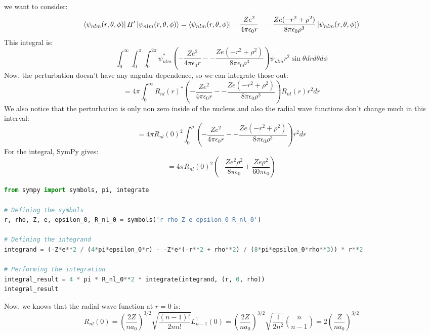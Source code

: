 \documentclass[12pt]{article}
\begin{document}
\subsection{}
we want to consider:
\begin{equation}
  \bra{\psi_{n l m}(r, \theta, \phi)}H'\ket{\psi_{n l m}(r, \theta, \phi)} = \bra{\psi_{n l m}(r, \theta, \phi)}-\frac{Ze^2}{4\pi\epsilon_0 r} - -\frac{Ze(-r^2 + \rho^2)}{8\pi\epsilon_0\rho^3}\ket{\psi_{n l m}(r, \theta, \phi)}
\end{equation}
This integral is:
\begin{equation}
  \int_{0}^{\infty} \int_{0}^{\pi} \int_{0}^{2 \pi} \psi_{n l m}^{*}(-\frac{Ze^2}{4\pi\epsilon_0 r} - -\frac{Ze(-r^2 + \rho^2)}{8\pi\epsilon_0\rho^3}) \psi_{n l m} r^{2} \sin \theta d r d \theta d \phi
\end{equation}
Now, the perturbation doesn't have any angular dependence, so we can integrate those out:
\begin{equation}
  = 4 \pi \int_{0}^{\infty} R_{nl}(r)^{*}(-\frac{Ze^2}{4\pi\epsilon_0 r} - -\frac{Ze(-r^2 + \rho^2)}{8\pi\epsilon_0\rho^3}) R_{nl}(r) r^{2} d r
\end{equation}
We also notice that the perturbation is only non zero inside of the nucleus and also the radial wave functions don't change much in this interval:
\begin{equation}
  = 4 \pi R_{nl}(0)^2 \int_{0}^{\rho}(-\frac{Ze^2}{4\pi\epsilon_0 r} - -\frac{Ze(-r^2 + \rho^2)}{8\pi\epsilon_0\rho^3}) r^{2} d r
\end{equation}
For the integral, SymPy gives:
\begin{equation}
  = 4 \pi R_{nl}(0)^2 \left(-\frac{Ze^2\rho^2}{8\pi\epsilon_0} + \frac{Ze\rho^2}{60\pi\epsilon_0} \right)
\end{equation}
\begin{lstlisting}[language=Python]
from sympy import symbols, pi, integrate

# Defining the symbols
r, rho, Z, e, epsilon_0, R_nl_0 = symbols('r rho Z e epsilon_0 R_nl_0')

# Defining the integrand
integrand = (-Z*e**2 / (4*pi*epsilon_0*r) - -Z*e*(-r**2 + rho**2) / (8*pi*epsilon_0*rho**3)) * r**2

# Performing the integration
integral_result = 4 * pi * R_nl_0**2 * integrate(integrand, (r, 0, rho))
integral_result
\end{lstlisting}
Now, we knows that the radial wave function at $r=0$ is:
\begin{equation}
  R_{nl}(0) = \left(\frac{2 Z}{n a_{0}}\right)^{3 / 2} \sqrt{\frac{(n-1) !}{2 nn !}} L_{n-1}^{1}\left(0\right) = \left(\frac{2 Z}{n a_{0}}\right)^{3 / 2} \sqrt{\frac{1}{2n^2}}\binom{n}{n-1} = 2 \left(\frac{Z}{n a_{0}}\right)^{3 / 2}
\end{equation}
\end{document}
